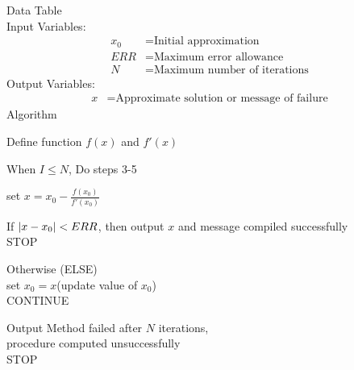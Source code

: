 \documentclass[12pt,class=book,crop=false]{standalone}
\begin{document}
\begin{soln}
    Data Table\\
    Input Variables:
    \begin{align*}
        x_0 & =\text{Initial approximation}        \\
        ERR & =\text{Maximum error allowance}      \\
        N   & =\text{Maximum number of iterations}
    \end{align*}
    Output Variables:
    \begin{align*}
        x & =\text{Approximate solution or message of failure}
    \end{align*}
    Algorithm
    \begin{enumerate}[label={Step \arabic* :} ]
        \item Define function \( f(x) \) and \( f'(x) \)
        \item When \( I\leq N \), Do steps 3-5
              {\setlength\itemindent{50pt}\item set \( x=x_0-\frac{f(x_0)}{f'(x_0)} \)}
              {\setlength\itemindent{50pt}\item If \( \left\vert x-x_0\right\vert<ERR \), then output \( x \) and message compiled successfully\\
              \-\hspace{1.55cm} STOP}
              {\setlength\itemindent{50pt}\item Otherwise (ELSE)\\
              \-\hspace{1.55cm} set \( x_0=x \)(update value of \( x_0 \))\\
              \-\hspace{1.55cm} CONTINUE}
        \item Output Method failed after \( N \) iterations,\\
              procedure computed unsuccessfully\\
              STOP
    \end{enumerate}
\end{soln}
\end{document}
